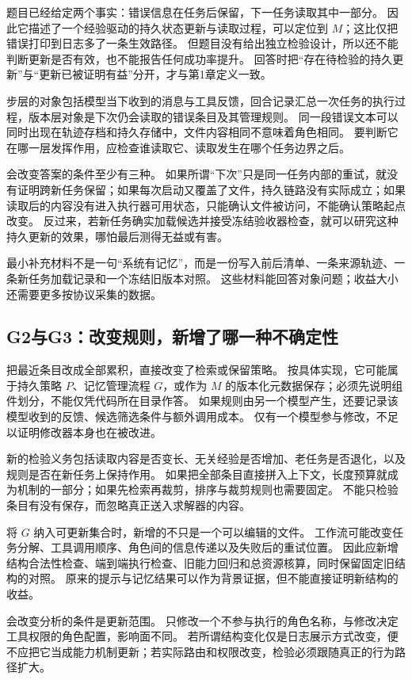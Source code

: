 题目已经给定两个事实：错误信息在任务后保留，下一任务读取其中一部分。
因此它描述了一个经验驱动的持久状态更新与读取过程，可以定位到 $M$；这比仅把错误打印到日志多了一条生效路径。
但题目没有给出独立检验设计，所以还不能判断更新是否有效，也不能报告任何成功率提升。
回答时把``存在待检验的持久更新''与``更新已被证明有益''分开，才与第1章定义一致。

步层的对象包括模型当下收到的消息与工具反馈，回合记录汇总一次任务的执行过程，版本层对象是下次仍会读取的错误条目及其管理规则。
同一段错误文本可以同时出现在轨迹存档和持久存储中，文件内容相同不意味着角色相同。
要判断它在哪一层发挥作用，应检查谁读取它、读取发生在哪个任务边界之后。

会改变答案的条件至少有三种。
如果所谓``下次''只是同一任务内部的重试，就没有证明跨新任务保留；如果每次启动又覆盖了文件，持久链路没有实际成立；如果读取后的内容没有进入执行器可用状态，只能确认文件被访问，不能确认策略起点改变。
反过来，若新任务确实加载候选并接受冻结验收器检查，就可以研究这种持久更新的效果，哪怕最后测得无益或有害。

最小补充材料不是一句``系统有记忆''，而是一份写入前后清单、一条来源轨迹、一条新任务加载记录和一个冻结旧版本对照。
这些材料能回答对象问题；收益大小还需要更多按协议采集的数据。

\subsection{G2与G3：改变规则，新增了哪一种不确定性}\label{sol:g02}

把最近条目改成全部累积，直接改变了检索或保留策略。
按具体实现，它可能属于持久策略 $P$、记忆管理流程 $G$，或作为 $M$ 的版本化元数据保存；必须先说明组件划分，不能仅凭代码所在目录作答。
如果规则由另一个模型产生，还要记录该模型收到的反馈、候选筛选条件与额外调用成本。
仅有一个模型参与修改，不足以证明修改器本身也在被改进。

新的检验义务包括读取内容是否变长、无关经验是否增加、老任务是否退化，以及规则是否在新任务上保持作用。
如果把全部条目直接拼入上下文，长度预算就成为机制的一部分；如果先检索再裁剪，排序与裁剪规则也需要固定。
不能只检验条目有没有保存，而忽略真正送入求解器的内容。

\leavevmode{}\label{sol:g03}将 $G$ 纳入可更新集合时，新增的不只是一个可以编辑的文件。
工作流可能改变任务分解、工具调用顺序、角色间的信息传递以及失败后的重试位置。
因此应新增结构合法性检查、端到端执行检查、旧能力回归和总资源核算，同时保留固定旧结构的对照。
原来的提示与记忆结果可以作为背景证据，但不能直接证明新结构的收益。

会改变分析的条件是更新范围。
只修改一个不参与执行的角色名称，与修改决定工具权限的角色配置，影响面不同。
若所谓结构变化仅是日志展示方式改变，便不应把它当成能力机制更新；若实际路由和权限改变，检验必须跟随真正的行为路径扩大。

